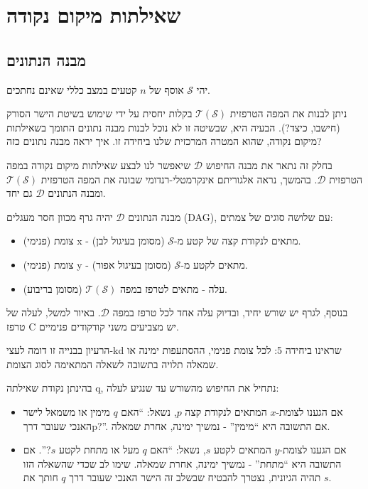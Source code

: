 \documentclass[
]{book}
\providecommand{\tightlist}{%
  \setlength{\itemsep}{0pt}\setlength{\parskip}{0pt}}
\begin{document}
\hypertarget{point-location-queries}{%
\section{שאילתות מיקום נקודה}\label{point-location-queries}}

\hypertarget{the-data-structure}{%
\subsection{מבנה הנתונים}\label{the-data-structure}}

יהי \(\mathcal{S}\) אוסף של \(n\) קטעים במצב כללי שאינם נחתכים.

ניתן לבנות את המפה הטרפזית \(\mathcal{T}(\mathcal{S})\) בקלות יחסית על ידי שימוש בשיטת הישר הסורק (חישבו, כיצד?).
הבעיה היא, שבשיטה זו לא נוכל לבנות מבנה נתונים התומך בשאילתות מיקום נקודה, שהוא המטרה המרכזית שלנו ביחידה זו.
איך יראה מבנה נתונים כזה?

בחלק זה נתאר את מבנה החיפוש \(\mathcal{D}\) שיאפשר לנו לבצע שאילתות מיקום נקודה במפה הטרפזית \(\mathcal{D}\).
בהמשך, נראה אלגוריתם אינקרמטלי-רנדומי שבונה את המפה הטרפזית \(\mathcal{T}(\mathcal{S})\) ומבנה הנתונים \(\mathcal{D}\) גם יחד.

מבנה הנתונים \(\mathcal{D}\) יהיה גרף מכוון חסר מעגלים (DAG), עם שלושה סוגים של צמתים:

\begin{itemize}
\tightlist
\item
  צומת (פנימי) x - מתאים לנקודת קצה של קטע מ-\(\mathcal{S}\) (מסומן בעיגול לבן).
\item
  צומת (פנימי) y - מתאים לקטע מ-\(\mathcal{S}\) (מסומן בעיגול אפור).
\item
  עלה - מתאים לטרפז במפה \(\mathcal{T}(\mathcal{S})\) (מסומן בריבוע).
\end{itemize}

בנוסף, לגרף יש שורש יחיד, ובדיוק עלה אחד לכל טרפז במפה \(\mathcal{D}\).
באיור למשל, לעלה של טרפז C יש מצביעים משני קודקודים פנימיים.

הרעיון בבנייה זו דומה לעצי-kd שראינו ביחידה 5: לכל צומת פנימי, ההסתעפות ימינה או שמאלה תלויה בתשובה לשאלה המתאימה לסוג הצומת.

בהינתן נקודת שאילתה q, נתחיל את החיפוש מהשורש עד שנגיע לעלה:

\begin{itemize}
\tightlist
\item
  אם הגענו לצומת-\(x\) המתאים לנקודת קצה \(p\), נשאל: ``האם \(q\) מימין או משמאל לישר האנכי שעובר דרךp?''. אם התשובה היא ``מימין'' - נמשיך ימינה, אחרת שמאלה.
\item
  אם הגענו לצומת-\(y\) המתאים לקטע \(s\), נשאל: ``האם \(q\) מעל או מתחת לקטע \(s\)?''. אם התשובה היא ``מתחת'' - נמשיך ימינה, אחרת שמאלה. שימו לב שכדי שהשאלה הזו תהיה הגיונית, נצטרך להבטיח שבשלב זה הישר האנכי שעובר דרך \(q\) חותך את \(s\).
\end{itemize}
\end{document}
